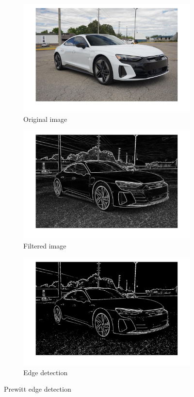 \documentclass[conference]{IEEEtran}
\begin{document}
\begin{figure}[h!]
\centering
\begin{subfigure}[b]{0.3\linewidth}
\includegraphics[width=\linewidth]{images/original.jpg}
\caption{Original image}
\end{subfigure}
\begin{subfigure}[b]{0.3\linewidth}
\includegraphics[width=\linewidth]{images/img3.jpg}
\caption{Filtered image}
\end{subfigure}
\begin{subfigure}[b]{0.3\linewidth}
\includegraphics[width=\linewidth]{images/img4.jpg}
\caption{Edge detection}
\end{subfigure}
\caption{Prewitt edge detection}
\label{fig:prewitt edge}
\end{figure}
\end{document}
